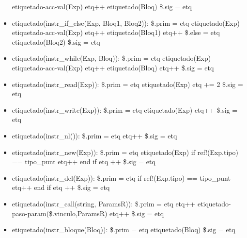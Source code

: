 \documentclass[11pt]{article}
\begin{document}
\begin{itemize}
            \subitem etiquetado-acc-val(Exp)
            \subitem etq++
            \subitem etiquetado(Bloq)
            \subitem \$.sig = etq
        \item etiquetado(instr\_if\_else(Exp, Bloq1, Bloq2)): 
            \subitem \$.prim = etq
            \subitem etiquetado(Exp)
            \subitem etiquetado-acc-val(Exp)
            \subitem etq++
            \subitem etiquetado(Bloq1)
            \subitem etq++
            \subitem \$.else = etq
            \subitem etiquetado(Bloq2)
            \subitem \$.sig = etq
        \item etiquetado(instr\_while(Exp, Bloq)): 
            \subitem \$.prim = etq
            \subitem etiquetado(Exp)
            \subitem etiquetado-acc-val(Exp)
            \subitem etq++
            \subitem etiquetado(Bloq)
            \subitem etq++
            \subitem \$.sig = etq
        \item etiquetado(instr\_read(Exp)): 
            \subitem \$.prim = etq
            \subitem etiquetado(Exp)
            \subitem etq += 2
            \subitem \$.sig = etq
        \item etiquetado(instr\_write(Exp)): 
            \subitem \$.prim = etq
            \subitem etiquetado(Exp)
            \subitem etq++
            \subitem \$.sig = etq
        \item etiquetado(instr\_nl()): 
            \subitem \$.prim = etq
            \subitem etq++
            \subitem \$.sig = etq
        \item etiquetado(instr\_new(Exp)):  
            \subitem \$.prim = etq
            \subitem etiquetado(Exp)
            \subitem if ref!(Exp.tipo) == tipo\_punt
                \subsubitem etq++
            \subitem end if
            \subitem etq ++
            \subitem \$.sig = etq
        \item etiquetado(instr\_del(Exp)):
            \subitem \$.prim = etq
            \subitem if ref!(Exp.tipo) == tipo\_punt
                \subsubitem etq++
            \subitem end if 
            \subitem etq ++ 
            \subitem \$.sig = etq
        \item etiquetado(instr\_call(string, ParamsR)): 
            \subitem \$.prim = etq
            \subitem etq++
            \subitem etiquetado-paso-param(\$.vinculo,ParamsR)
            \subitem etq++
            \subitem \$.sig = etq
        \item etiquetado(instr\_bloque(Bloq)): 
            \subitem \$.prim = etq
            \subitem etiquetado(Bloq)
            \subitem \$.sig = etq

\end{itemize}
\end{document}

